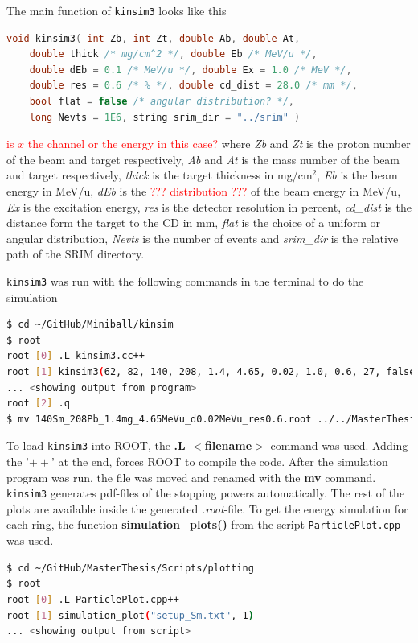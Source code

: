 \documentclass[twoside,english]{uiofysmaster/uiofysmaster}
\begin{document}
The main function of \texttt{kinsim3} looks like this
\begin{lstlisting}[language=c++]
void kinsim3( int Zb, int Zt, double Ab, double At, 
	double thick /* mg/cm^2 */, double Eb /* MeV/u */, 
	double dEb = 0.1 /* MeV/u */, double Ex = 1.0 /* MeV */, 
	double res = 0.6 /* % */, double cd_dist = 28.0 /* mm */, 
	bool flat = false /* angular distribution? */, 
	long Nevts = 1E6, string srim_dir = "../srim" )
\end{lstlisting}
\textcolor{red}{is $x$ the channel or the energy in this case?} \newline
where \textit{Zb} and \textit{Zt} is the proton number of the beam and target respectively, \textit{Ab} and \textit{At} is the mass number of the beam and target respectively, \textit{thick} is the target thickness in mg/cm$^2$, \textit{Eb} is the beam energy in MeV/u, \textit{dEb} is the \textcolor{red}{??? distribution ???} of the beam energy in MeV/u, \textit{Ex} is the excitation energy, \textit{res} is the detector resolution in percent, \textit{cd\_dist} is the distance form the target to the CD in mm, \textit{flat} is the choice of a uniform or angular distribution, \textit{Nevts} is the number of events and \textit{srim\_dir} is the relative path of the SRIM directory.

\texttt{kinsim3} was run with the following commands in the terminal to do the simulation
\begin{lstlisting}[language=sh]
$ cd ~/GitHub/Miniball/kinsim
$ root
root [0] .L kinsim3.cc++
root [1] kinsim3(62, 82, 140, 208, 1.4, 4.65, 0.02, 1.0, 0.6, 27, false, 1e6, "../SRIM")
... <showing output from program>
root [2] .q
$ mv 140Sm_208Pb_1.4mg_4.65MeVu_d0.02MeVu_res0.6.root ../../MasterThesis/Sorted_data/sim_140Sm_208Pb.root
\end{lstlisting}
To load \texttt{kinsim3} into ROOT, the \textbf{.L $<$filename$>$} command was used. Adding the '$++$' at the end, forces ROOT to compile the code. 
After the simulation program was run, the file was moved and renamed with the \textbf{mv} command. 
\texttt{kinsim3} generates pdf-files of the stopping powers automatically. 
The rest of the plots are available inside the generated \textit{.root}-file. 
To get the energy simulation for each ring, the function \textbf{simulation\_plots()} from the script \texttt{ParticlePlot.cpp} was used. 
\begin{lstlisting}[language=sh]
$ cd ~/GitHub/MasterThesis/Scripts/plotting
$ root
root [0] .L ParticlePlot.cpp++
root [1] simulation_plot("setup_Sm.txt", 1)
... <showing output from script>
\end{lstlisting}
\end{document}
